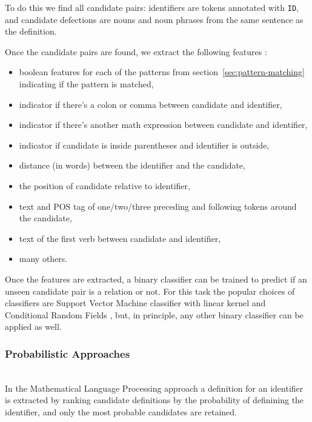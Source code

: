 To do this we find all candidate pairs: identifiers are tokens
annotated with \texttt{ID}, and candidate defections are nouns and
noun phrases from the same sentence as the definition.

Once the candidate pairs are found, we extract the following features 
\cite{yokoi2011contextual} \cite{kristianto2014extracting}:


\begin{itemize}
\itemsep1pt\parskip0pt
  \item boolean features for each of the patterns from
    section~\ref{sec:pattern-matching} indicating if the pattern is matched,
  \item indicator if there's a colon or comma between candidate and identifier,
  \item indicator if there's another math expression between candidate and identifier,
  \item indicator if candidate is inside parentheses and identifier is outside,
  \item distance (in words) between the identifier and the candidate,
  \item the position of candidate relative to identifier,
  \item text and POS tag of one/two/three preceding and following tokens around the candidate,
  \item text of the first verb between candidate and identifier,
  \item many others.
\end{itemize}

Once the features are extracted, a binary classifier can be trained to predict
if an unseen candidate pair is a relation or not.
For this task the popular choices of classifiers are Support Vector Machine
classifier with linear kernel \cite{kristianto2014extracting} \cite{yokoi2011contextual}
and Conditional Random Fields \cite{kristianto2014extracting},
but, in principle, any other binary classifier can be applied
as well.


\subsubsection{Probabilistic Approaches} \label{sec:mlp} \ \\

In the Mathematical Language Processing approach \cite{pagael2014mlp}
a definition for an identifier is extracted by ranking
candidate definitions by the probability of definining
the identifier, and only the most probable candidates are retained.

